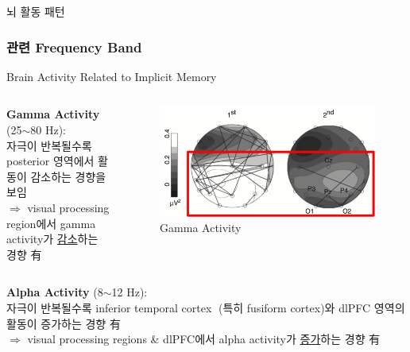 \documentclass{beamer}
\begin{document}
\begin{frame}{뇌 활동 패턴}
\begin{itemize}
  \end{itemize}
\end{frame}

\subsubsection{관련 Frequency Band}
\begin{frame}{Brain Activity Related to Implicit Memory}
    \begin{columns}
    \begin{column}{0.62\textwidth}
      \large
      \textbf{Gamma Activity} (25$\sim$80 Hz):\\
      자극이 반복될수록 posterior 영역에서 활동이 감소하는 경향을 보임\\
      {\color{blue} $\Rightarrow$ visual processing region에서 gamma activity가 \underline{감소}하는 경향 有}
    \end{column}
    \hfill
    \begin{column}{0.38\textwidth}
      \centering
      \begin{figure}
        \centering
        \includegraphics[width=\textwidth]{image/gamma_im}
        \caption{Gamma Activity}
      \end{figure}
    \end{column}
  \end{columns}
  \begin{columns}
    \begin{column}{0.62\textwidth}
      \large
      \textbf{Alpha Activity} (8$\sim$12 Hz):\\
      자극이 반복될수록 inferior temporal cortex (특히 fusiform cortex)와 dlPFC 영역의 활동이 증가하는 경향 有\\
      {\color{blue} $\Rightarrow$ visual processing regions \& dlPFC에서 alpha activity가 \underline{증가}하는 경향 有}
    \end{column}

\end{columns}
\end{frame}
\end{document}
